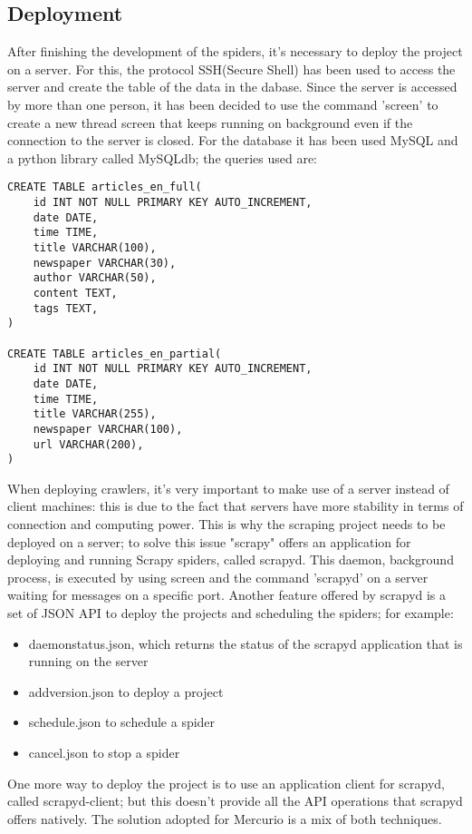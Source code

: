 \subsection{Deployment}
After finishing the development of the spiders, it's necessary to deploy the project on a server. 
For this, the protocol SSH(Secure Shell)\cite{ssh} has been used to access the server and create the table of the data in the dabase.
Since the server is accessed by more than one person, it has been decided to use the command 'screen' to create a new thread screen that keeps running on background even if the connection to the server is closed. For the database it has been used MySQL and a python library called MySQLdb; the queries used are:
\begin{verbatim}
CREATE TABLE articles_en_full(
    id INT NOT NULL PRIMARY KEY AUTO_INCREMENT,
    date DATE,
    time TIME,
    title VARCHAR(100),
    newspaper VARCHAR(30),
    author VARCHAR(50),
	content TEXT,
    tags TEXT,
)

CREATE TABLE articles_en_partial(
    id INT NOT NULL PRIMARY KEY AUTO_INCREMENT,
    date DATE,
    time TIME,
    title VARCHAR(255),
    newspaper VARCHAR(100),
    url VARCHAR(200),
)
\end{verbatim} 
When deploying crawlers, it's very important to make use of a server instead of client machines: this is due to the fact that servers have more stability in terms of connection and computing power. 
This is why the scraping project needs to be deployed on a server; to solve this issue "scrapy" offers an application for deploying and running Scrapy spiders, called scrapyd\cite{scrapyd}. 
This daemon, background process, is executed by using screen and the command 'scrapyd' on a server waiting for messages on a specific port. 
Another feature offered by scrapyd is a set of JSON API to deploy the projects and scheduling the spiders; for example:
\begin{itemize}
	\item daemonstatus.json, which returns the status of the scrapyd application that is running on the server
	\item addversion.json to deploy a project
	\item schedule.json to schedule a spider
	\item cancel.json to stop a spider
\end{itemize}
One more way to deploy the project is to use an application client for scrapyd, called scrapyd-client\cite{scrapydclient}; but this doesn't provide all the API operations that scrapyd offers natively. The solution adopted for Mercurio is a mix of both techniques. 
